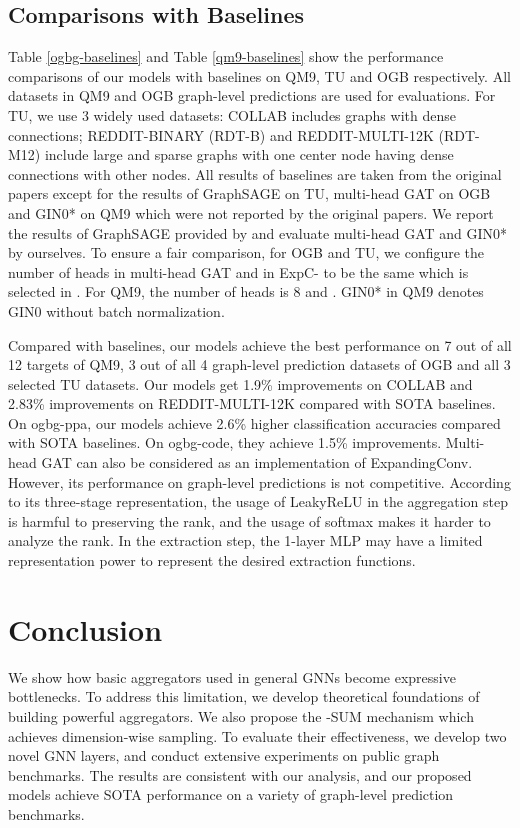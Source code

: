 \documentclass{article} \usepackage{iclr2021_conference,times}
\begin{document}
\subsection{Comparisons with Baselines}
Table \ref{ogbg-baselines} and Table \ref{qm9-baselines} show the performance comparisons of our models with baselines on QM9, TU and OGB respectively.
All datasets in QM9 and OGB graph-level predictions are used for evaluations.
For TU, we use 3 widely used datasets:
COLLAB includes graphs with dense connections;
REDDIT-BINARY (RDT-B) and REDDIT-MULTI-12K (RDT-M12) include large and sparse graphs with one center node having dense connections with other nodes.
All results of baselines are taken from the original papers except for the results of GraphSAGE on TU, multi-head GAT on OGB and GIN0* on QM9 which were not reported by the original papers.
We report the results of GraphSAGE provided by \citep{ying2018hierarchical} and evaluate multi-head GAT and GIN0* by ourselves.
To ensure a fair comparison,
for OGB and TU, we configure the number of heads in multi-head GAT and  in ExpC- to be the same which is selected in .
For QM9, the number of heads is 8 and .
GIN0* in QM9 denotes GIN0 without batch normalization.


Compared with baselines, our models achieve the best performance on 7 out of all 12 targets of QM9, 3 out of all 4 graph-level prediction datasets of OGB and all 3 selected TU datasets.
Our models get 1.9\% improvements on COLLAB and 2.83\% improvements on REDDIT-MULTI-12K compared with SOTA baselines.
On ogbg-ppa, our models achieve 2.6\% higher classification accuracies compared with SOTA baselines.
On ogbg-code, they achieve 1.5\% improvements.
Multi-head GAT can also be considered as an implementation of ExpandingConv.
However, its performance on graph-level predictions is not competitive.
According to its three-stage representation,
the usage of LeakyReLU in the aggregation step is harmful to preserving the rank, and the usage of softmax makes it harder to analyze the rank.
In the extraction step, the 1-layer MLP may have a limited representation power to represent the desired extraction functions.



\section{Conclusion}
We show how basic aggregators used in general GNNs become expressive bottlenecks.
To address this limitation,
we develop theoretical foundations of building powerful aggregators.
We also propose the -SUM mechanism which achieves dimension-wise sampling.
To evaluate their effectiveness,
we develop two novel GNN layers,
and conduct extensive experiments on public graph benchmarks.
The results are consistent with our analysis,
and our proposed models achieve SOTA performance on a variety of graph-level prediction benchmarks.
\end{document}
